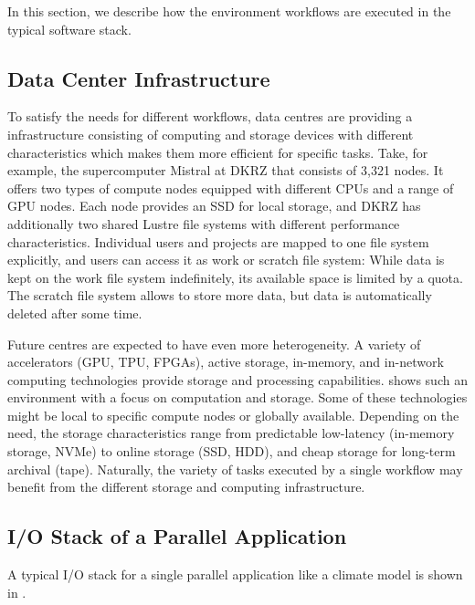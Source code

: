 \documentclass{superfri}
\newcommand{\jk}[1]{\todo[inline]{JK: #1}}
\begin{document}
In this section, we describe how the environment workflows are executed in the typical software stack.

\subsection{Data Center Infrastructure}

To satisfy the needs for different workflows, data centres are providing a infrastructure consisting of computing and storage devices with different characteristics which makes them more efficient for specific tasks.
Take, for example, the supercomputer Mistral at DKRZ that consists of 3,321 nodes.
It offers two types of compute nodes equipped with different CPUs and a range of GPU nodes.
Each node provides an SSD for local storage, and DKRZ has additionally two shared Lustre file systems with different performance characteristics.
Individual users and projects are mapped to one file system explicitly, and users can access it as work or scratch file system: While data is kept on the work file system indefinitely, its available space is limited by a quota.
The scratch file system allows to store more data, but data is automatically deleted after some time.

Future centres are expected to have even more heterogeneity. A variety of accelerators (GPU, TPU, FPGAs), active storage, in-memory, and in-network computing technologies provide storage and processing capabilities.
 shows such an environment with a focus on computation and storage.
Some of these technologies might be local to specific compute nodes or globally available.
Depending on the need, the storage characteristics range from predictable low-latency (in-memory storage, NVMe) to online storage (SSD, HDD), and cheap storage for long-term archival (tape).
\jk{Mention BBs, e.g., DDN IME}
Naturally, the variety of tasks executed by a single workflow may benefit from the different storage and computing infrastructure.


\subsection{I/O Stack of a Parallel Application}

A typical I/O stack for a single parallel application like a climate model is shown in .
\end{document}
